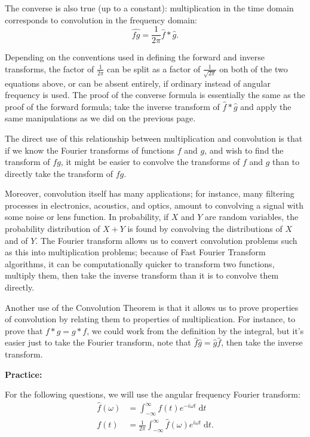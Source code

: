 \documentclass{article}
\newcommand{\diff}{\;\mathrm{d}}
\begin{document}
The converse is also true (up to a constant): multiplication in the time domain corresponds to convolution in the frequency domain:
\[\widehat{fg}=\frac{1}{2\pi}\hat{f}\ast \hat{g}.\]

Depending on the conventions used in defining the forward and inverse transforms, the factor of $\frac{1}{2\pi}$ can be split as a factor of $\frac{1}{\sqrt{2\pi}}$ on both of the two equations above, or can be absent entirely, if ordinary instead of angular frequency is used. The proof of the converse formula is essentially the same as the proof of the forward formula; take the inverse transform of $\hat{f}\ast\hat{g}$ and apply the same manipulations as we did on the previous page.\bigskip


The direct use of this relationship between multiplication and convolution is that if we know the Fourier transforms of functions $f$ and $g$, and wish to find the transform of $fg$, it might be easier to convolve the transforms of $f$ and $g$ than to directly take the transform of $fg$.

Moreover, convolution itself has many applications; for instance, many filtering processes in electronics, acoustics, and optics, amount to convolving a signal with some noise or lens function. In probability, if $X$ and $Y$ are random variables, the probability distribution of $X+Y$ is found by convolving the distributions of $X$ and of $Y$. The Fourier transform allows us to convert convolution problems such as this into multiplication problems; because of Fast Fourier Transform algorithms, it can be computationally quicker to transform two functions, multiply them, then take the inverse transform than it is to convolve them directly.\bigskip


Another use of the Convolution Theorem is that it allows us to prove properties of convolution by relating them to properties of multiplication. For instance, to prove that $f\ast g=g\ast f$, we could work from the definition by the integral, but it's easier just to take the Fourier transform, note that $\hat{f}\hat{g}=\hat{g}\hat{f}$, then take the inverse transform.






\clearpage



\textbf{Practice:}\bigskip

For the following questions, we will use the angular frequency Fourier transform:
\begin{align*}
	\hat{f}(\omega)&=\int_{-\infty}^\infty f(t)e^{-i\omega t}\diff t\\
	f(t)&=\frac{1}{2\pi}\int_{-\infty}^\infty \hat{f}(\omega)e^{i\omega t}\diff t.
\end{align*}
\end{document}
